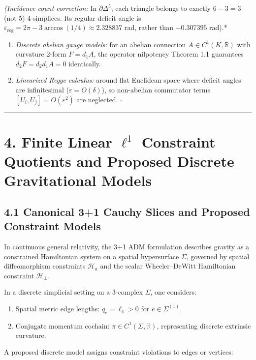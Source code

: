 \documentclass[11pt]{article}
\begin{document}
\emph{(Incidence count correction:} In $\partial \Delta^5$, each triangle belongs to exactly $6 - 3 = 3$ (not 5) 4-simplices. Its regular deficit angle is $\varepsilon_{\mathrm{reg}} = 2\pi - 3\arccos(1/4) \approx 2.328837$ rad, rather than $-0.307395$ rad).*

\begin{enumerate}[leftmargin=1.4em,itemsep=0.2em]
\item \emph{Discrete abelian gauge models:} for an abelian connection $A \in C^1(K, \mathbb{R})$ with curvature 2-form $F = d_1 A$, the operator nilpotency Theorem 1.1 guarantees $d_2 F = d_2 d_1 A = 0$ identically.
\item \emph{Linearized Regge calculus:} around flat Euclidean space where deficit angles are infinitesimal ($\varepsilon = O(\delta)$), so non-abelian commutator terms $[U_i, U_j] = O(\varepsilon^2)$ are neglected. $\square$
\end{enumerate}
\medskip\hrule\medskip
\section{\texorpdfstring{4. Finite Linear $\ell^1$ Constraint Quotients and Proposed Discrete Gravitational Models}{4. Finite Linear ℓ¹ Constraint Quotients and Proposed Discrete Gravitational Models}}

\subsection{\texorpdfstring{4.1 Canonical 3+1 Cauchy Slices and Proposed Constraint Models}{4.1 Canonical 3+1 Cauchy Slices and Proposed Constraint Models}}

In continuous general relativity, the 3+1 ADM formulation describes gravity as a constrained Hamiltonian system on a spatial hypersurface $\Sigma$, governed by spatial diffeomorphism constraints $\mathcal{H}_a$ and the scalar Wheeler--DeWitt Hamiltonian constraint $\mathcal{H}_\perp$.

In a discrete simplicial setting on a 3-complex $\Sigma$, one considers:

\begin{enumerate}[leftmargin=1.4em,itemsep=0.2em]
\item Spatial metric edge lengths: $q_e = \ell_e > 0$ for $e \in \Sigma^{(1)}$.
\item Conjugate momentum cochain: $\pi \in C^1(\Sigma, \mathbb{R})$, representing discrete extrinsic curvature.
\end{enumerate}
A proposed discrete model assigns constraint violations to edges or vertices:
\end{document}

